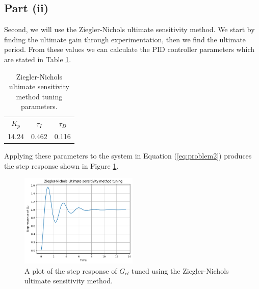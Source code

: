 \documentclass[10pt,a4paper]{article}
\begin{document}
    \subsection{Part (ii)}
        Second, we will use the Ziegler-Nichols ultimate sensitivity method. We start by finding the ultimate gain through experimentation, then we find the ultimate period. From these values we can calculate the PID controller parameters which are stated in Table \ref{tb:znu_params}.
        \begin{table}[h]
            \centering
            \begin{tabular}{ c | c | c }
                $K_p$ & $\tau_I$ & $\tau_D$ \\
                14.24 & 0.462    & 0.116
            \end{tabular}
            \caption{Ziegler-Nichols ultimate sensitivity method tuning parameters.}
            \label{tb:znu_params}
        \end{table}
        Applying these parameters to the system in Equation (\ref{eq:problem2}) produces the step response shown in Figure \ref{fig:znu_gcl}.
        \begin{figure}[h]
            \centering
            \includegraphics[width=0.5\textwidth]{znu_Gcl.png}
            \caption{A plot of the step response of $G_{cl}$ tuned using the Ziegler-Nichols ultimate sensitivity method.}
            \label{fig:znu_gcl}
        \end{figure}
        
\end{document}

